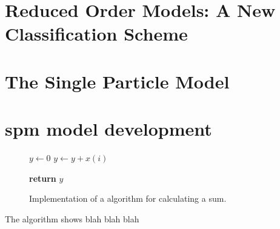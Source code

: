 



\graphicspath{{4/figures/}}

\section{Reduced Order Models: A New Classification Scheme}\label{sec:classificationscheme}


\section{The Single Particle Model}


\section{\gls{spm} model development}\label{sec:spmmodeldevelopment}


\begin{figure}[htb]
    \begin{algorithmic}[1]


        \State $y\gets0$
         
        \State $y\gets y+x(i)$ 
        \EndFor

        \State \textbf{return}  $y$
        \EndProcedure
    \end{algorithmic}
    \caption[Implementation of a algorithm for calculating a sum.]{Implementation of a algorithm for calculating a sum.}
    \label{fig:algorithm1}
\end{figure}

The  algorithm shows blah blah blah


